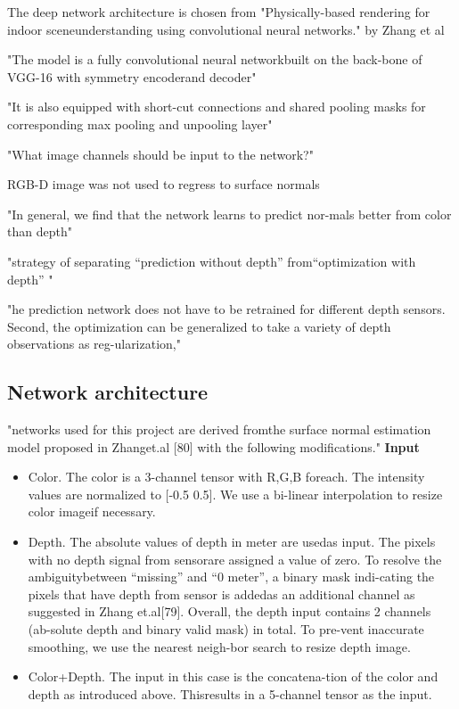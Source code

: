  The deep network architecture is chosen from "Physically-based rendering for indoor sceneunderstanding  using  convolutional  neural  networks." by Zhang et al  
  
 "The model is a fully convolutional neural networkbuilt on the back-bone of VGG-16 with symmetry encoderand decoder"  
  
 "It is also equipped with short-cut connections and shared pooling masks for corresponding max pooling and unpooling layer"  
  
 "What image channels should be input to the network?"
 
  RGB-D image was not used to regress to surface normals  
   
"In general, we find that the network learns to predict nor-mals better from color than depth"  
 
"strategy of separating “prediction without depth” from“optimization  with  depth”  "

"he prediction network does not have to be retrained for different depth sensors. Second, the optimization can be generalized to take a variety of depth observations as reg-ularization," 

\subsection{Network architecture}

"networks used for this project are derived fromthe  surface  normal  estimation  model  proposed  in  Zhanget.al [80] with the following modifications."  
\textbf{Input}
\begin{itemize}
    \item Color.  The color is a 3-channel tensor with R,G,B foreach. The intensity values are normalized to [-0.5 0.5]. We use a bi-linear interpolation to resize color imageif necessary.
    \item Depth. The absolute values of depth in meter are usedas input.  The pixels with no depth signal from sensorare assigned a value of zero. To resolve the ambiguitybetween “missing” and “0 meter”, a binary mask indi-cating the pixels that have depth from sensor is addedas  an  additional  channel  as  suggested  in  Zhang  et.al[79]. Overall, the depth input contains 2 channels (ab-solute depth and binary valid mask) in total.  To pre-vent inaccurate smoothing, we use the nearest neigh-bor search to resize depth image.
    \item Color+Depth.  The input in this case is the concatena-tion of the color and depth as introduced above.  Thisresults in a 5-channel tensor as the input.
\end{itemize}

